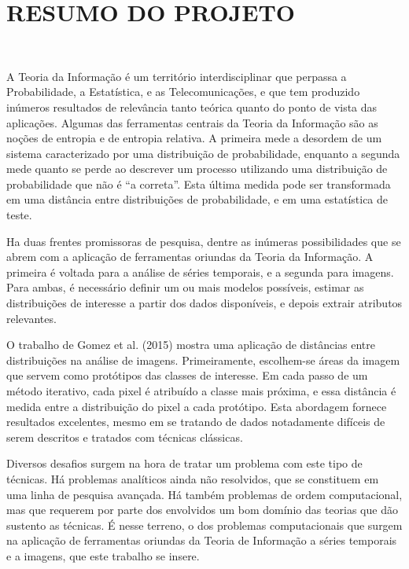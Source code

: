 \documentclass[12pt,letterpaper]{article}
\begin{document}
\hrulefill   


\newpage
\section*{\centering \textbf{RESUMO DO PROJETO}}
\hrulefill \\

\vspace{0.2cm}

A Teoria da Informação é um território interdisciplinar que perpassa a Probabilidade, a Estatística, e as Telecomunicações, e que tem produzido inúmeros resultados de relevância tanto teórica quanto do ponto de vista das aplicações. Algumas das ferramentas centrais da Teoria da Informação são as noções de entropia e de entropia relativa. A primeira mede a desordem de um sistema caracterizado por uma distribuição 
de probabilidade, enquanto a segunda mede quanto se perde ao descrever um processo utilizando uma distribuição de probabilidade que não é “a correta”. Esta última medida pode ser transformada em uma distância entre distribuições de probabilidade, e em uma estatística de teste. 

Ha duas frentes promissoras de pesquisa, dentre as inúmeras possibilidades que se abrem com a aplicação de ferramentas oriundas da Teoria da Informação. A primeira é voltada para a análise de séries temporais, e a segunda para imagens. Para ambas, é necessário definir um ou mais modelos possíveis, estimar as distribuições de interesse a partir dos dados disponíveis, e depois extrair atributos relevantes.

O trabalho de Gomez et al. (2015) mostra uma aplicação de distâncias entre distribuições na análise de imagens. Primeiramente, escolhem-se áreas da imagem que servem como protótipos das classes de interesse. Em cada passo de um método iterativo, cada pixel é atribuído a classe mais próxima, e essa distância é medida entre a distribuição do pixel a cada protótipo. Esta abordagem fornece resultados excelentes, mesmo em se tratando de dados notadamente difíceis de serem descritos e tratados com técnicas clássicas. 

Diversos desafios surgem na hora de tratar um problema com este tipo de técnicas. Há problemas analíticos ainda não resolvidos, que se constituem em uma linha de pesquisa avançada. Há também problemas de ordem computacional, mas que requerem por parte dos envolvidos um bom domínio das teorias que dão sustento as técnicas. É nesse terreno, o dos problemas computacionais que surgem na aplicação de ferramentas oriundas da 
Teoria de Informação a séries temporais e a imagens, que este trabalho se insere.
\end{document}
